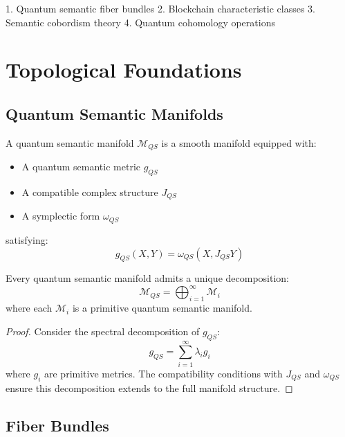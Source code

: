 \documentclass[12pt]{article}
\begin{document}
1. Quantum semantic fiber bundles
2. Blockchain characteristic classes
3. Semantic cobordism theory
4. Quantum cohomology operations

\section{Topological Foundations}

\subsection{Quantum Semantic Manifolds}

\begin{definition}
A quantum semantic manifold $\mathcal{M}_{QS}$ is a smooth manifold equipped with:
\begin{itemize}
\item A quantum semantic metric $g_{QS}$
\item A compatible complex structure $J_{QS}$
\item A symplectic form $\omega_{QS}$
\end{itemize}
satisfying:
\begin{equation}
g_{QS}(X,Y) = \omega_{QS}(X,J_{QS}Y)
\end{equation}
\end{definition}

\begin{theorem}
Every quantum semantic manifold admits a unique decomposition:
\begin{equation}
\mathcal{M}_{QS} = \bigoplus_{i=1}^{\infty} \mathcal{M}_i
\end{equation}
where each $\mathcal{M}_i$ is a primitive quantum semantic manifold.
\end{theorem}

\begin{proof}
Consider the spectral decomposition of $g_{QS}$:
\begin{equation}
g_{QS} = \sum_{i=1}^{\infty} \lambda_i g_i
\end{equation}
where $g_i$ are primitive metrics. The compatibility conditions with $J_{QS}$ and $\omega_{QS}$ ensure this decomposition extends to the full manifold structure.
\end{proof}

\subsection{Fiber Bundles}
\end{document}
